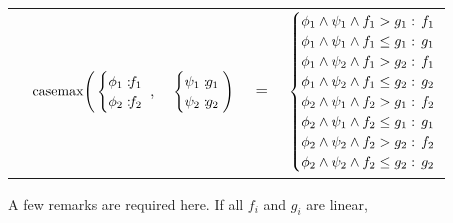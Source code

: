 {\footnotesize
\begin{center}
\begin{tabular}{r c c c l}
&
\hspace{-7mm} $\casemax \Bigg(
  \begin{cases}
    \phi_1: \hspace{-2mm} & \hspace{-2mm} f_1 \\ 
    \phi_2: \hspace{-2mm} & \hspace{-2mm} f_2 \\ 
  \end{cases}$
$,$
&
\hspace{-4mm}
  $\begin{cases}
    \psi_1: \hspace{-2mm} & \hspace{-2mm} g_1 \\ 
    \psi_2: \hspace{-2mm} & \hspace{-2mm} g_2 \\ 
  \end{cases} \Bigg)$
&
\hspace{-4mm} 
$ = $
&
\hspace{-4mm}
  $\begin{cases}
  \phi_1 \wedge \psi_1 \wedge f_1 > g_1    : & \hspace{-2mm} f_1 \\ 
  \phi_1 \wedge \psi_1 \wedge f_1 \leq g_1 : & \hspace{-2mm} g_1 \\ 
  \phi_1 \wedge \psi_2 \wedge f_1 > g_2    : & \hspace{-2mm}f_1 \\ 
  \phi_1 \wedge \psi_2 \wedge f_1 \leq g_2 : & \hspace{-2mm} g_2 \\ 
  \phi_2 \wedge \psi_1 \wedge f_2 > g_1    : & \hspace{-2mm} f_2 \\ 
  \phi_2 \wedge \psi_1 \wedge f_2 \leq g_1 : & \hspace{-2mm} g_1 \\ 
  \phi_2 \wedge \psi_2 \wedge f_2 > g_2    : & \hspace{-2mm} f_2 \\ 
  \phi_2 \wedge \psi_2 \wedge f_2 \leq g_2 : & \hspace{-2mm} g_2 \\ 
  \end{cases}$
\end{tabular}
\end{center}
} A few remarks are required here.  If all $f_i$ and $g_i$ are linear,
